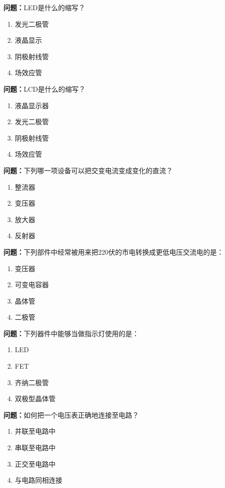 \documentclass{ctexbook}
\begin{document}
\textbf{问题：}LED是什么的缩写？
\begin{enumerate}[label=\Alph*), leftmargin=3em]
\item 发光二极管
\item 液晶显示
\item 阴极射线管
\item 场效应管
\end{enumerate}

\textbf{问题：}LCD是什么的缩写？
\begin{enumerate}[label=\Alph*), leftmargin=3em]
\item 液晶显示器
\item 发光二极管
\item 阴极射线管
\item 场效应管
\end{enumerate}

\textbf{问题：}下列哪一项设备可以把交变电流变成变化的直流？
\begin{enumerate}[label=\Alph*), leftmargin=3em]
\item 整流器
\item 变压器
\item 放大器
\item 反射器
\end{enumerate}

\textbf{问题：}下列部件中经常被用来把220伏的市电转换成更低电压交流电的是：
\begin{enumerate}[label=\Alph*), leftmargin=3em]
\item 变压器
\item 可变电容器
\item 晶体管
\item 二极管
\end{enumerate}

\textbf{问题：}下列器件中能够当做指示灯使用的是：
\begin{enumerate}[label=\Alph*), leftmargin=3em]
\item LED
\item FET
\item 齐纳二极管
\item 双极型晶体管
\end{enumerate}

\textbf{问题：}如何把一个电压表正确地连接至电路？
\begin{enumerate}[label=\Alph*), leftmargin=3em]
\item 并联至电路中
\item 串联至电路中
\item 正交至电路中
\item 与电路同相连接
\end{enumerate}
\end{document}
